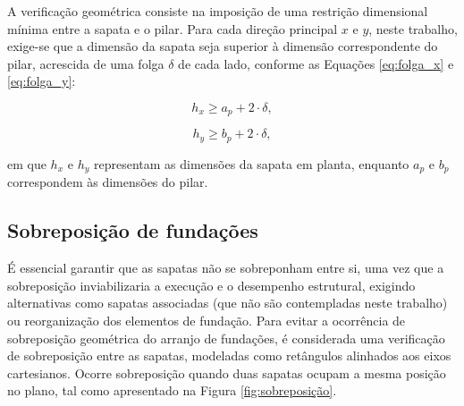 A verificação geométrica consiste na imposição de uma restrição dimensional mínima entre a sapata e o pilar. Para cada direção principal $x$ e $y$, neste trabalho, exige-se que a dimensão da sapata seja superior à dimensão correspondente do pilar, acrescida de uma folga $\delta$ de cada lado, conforme as Equações \eqref{eq:folga_x} e \eqref{eq:folga_y}:

\begin{equation}
    h_x \ge a_p + 2 \cdot\delta,
    \label{eq:folga_x}
\end{equation}

\begin{equation}
    h_y \ge b_p + 2 \cdot \delta,
    \label{eq:folga_y}
\end{equation}

em que $h_x$ e $h_y$ representam as dimensões da sapata em planta, enquanto $a_p$ e $b_p$ correspondem às dimensões do pilar.








\subsection{Sobreposição de fundações}
\label{subsec:projeto_sobreposicao}

É essencial garantir que as sapatas não se sobreponham entre si, uma vez que a sobreposição inviabilizaria a execução e o desempenho estrutural, exigindo alternativas como sapatas associadas (que não são contempladas neste trabalho) ou reorganização dos elementos de fundação.
Para evitar a ocorrência de sobreposição geométrica do arranjo de fundações, é considerada uma verificação de sobreposição entre as sapatas, modeladas como retângulos alinhados aos eixos cartesianos. Ocorre sobreposição quando duas sapatas ocupam a mesma posição no plano, tal como apresentado na Figura \ref{fig:sobreposição}.

